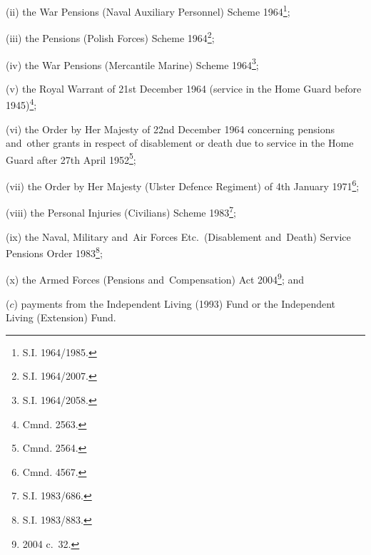 \documentclass[12pt,a4paper]{article}
\begin{document}
\begin{enumerate}
\begin{enumerate}
(ii) the War Pensions (Naval Auxiliary Personnel) Scheme 1964\footnote{\frenchspacing S.I. 1964/1985.};

(iii) the Pensions (Polish Forces) Scheme 1964\footnote{\frenchspacing S.I. 1964/2007.};

(iv) the War Pensions (Mercantile Marine) Scheme 1964\footnote{\frenchspacing S.I. 1964/2058.};

(v) the Royal Warrant of 21st December 1964 (service in the Home Guard before 1945)\footnote{\frenchspacing Cmnd. 2563.};

(vi) the Order by Her Majesty of 22nd December 1964 concerning pensions and~other grants in respect of disablement or death due to service in the Home Guard after 27th April 1952\footnote{\frenchspacing Cmnd. 2564.};

(vii) the Order by Her Majesty (Ulster Defence Regiment) of 4th January 1971\footnote{\frenchspacing Cmnd. 4567.};

(viii) the Personal Injuries (Civilians) Scheme 1983\footnote{\frenchspacing S.I. 1983/686.};

(ix) the Naval, Military and~Air Forces Etc.\ (Disablement and~Death) Service Pensions Order 1983\footnote{\frenchspacing S.I. 1983/883.}; 

(x) the Armed Forces (Pensions and~Compensation) Act 2004\footnote{2004 c.\ 32.}; and
\end{enumerate}

($c$) payments from 
the Independent Living (1993) Fund or the Independent Living (Extension) Fund. %
\end{enumerate}

\end{document}
